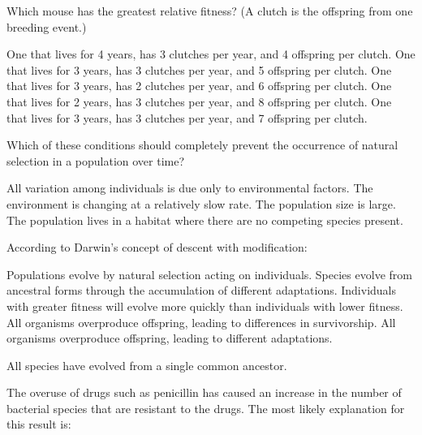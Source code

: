 \question
Which mouse has the greatest relative fitness? (A clutch is the offspring from one breeding event.)

\begin{choices}
\choice One that lives for 4 years, has 3 clutches per year, and 4 offspring per clutch.%
\choice One that lives for 3 years, has 3 clutches per year, and 5 offspring per clutch.%
\choice One that lives for 3 years, has 2 clutches per year, and 6 offspring per clutch. %
\choice One that lives for 2 years, has 3 clutches per year, and 8 offspring per clutch. %
\correctchoice One that lives for 3 years, has 3 clutches per year, and 7 offspring per clutch. %
\end{choices}

\question
Which of these conditions should completely prevent the occurrence of natural selection in a population over time?

\begin{choices}
\correctchoice All variation among individuals is due only to environmental factors. %
\choice The environment is changing at a relatively slow rate. %
\choice The population size is large. %
\choice The population lives in a habitat where there are no competing species present. %
\end{choices}

\question
According to Darwin's concept of descent with modification:

\begin{choices}
\choice Populations evolve by natural selection acting on individuals. %
\correctchoice Species evolve from ancestral forms through the accumulation of different adaptations. %
\choice Individuals with greater fitness will evolve more quickly than individuals with lower fitness. %
\choice All organisms overproduce offspring, leading to differences in survivorship. %
\choice All organisms overproduce offspring, leading to different adaptations. %
\end{choices}

\choice All species have evolved from a single common ancestor. %


\question
The overuse of drugs such as penicillin has caused an increase in the number of bacterial species that are resistant to the drugs. The most likely explanation for this result is:

